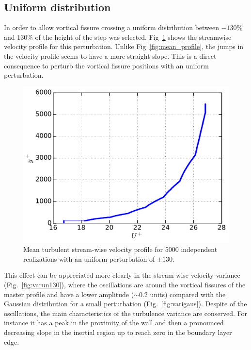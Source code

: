 \documentclass[aps,reprint,amsmath,amssymb,pra]{revtex4-1}%
\begin{document}
\subsection{Uniform distribution}
In order to allow vortical fissure crossing a uniform distribution between $-130\%$ and $130\%$ of the height of the step was selected. Fig~\ref{fig:mp_un130}  shows the streamwise velocity profile for this perturbation. Unlike Fig~\ref{fig:mean_profile}, the jumps in the velocity profile seems to have a more straight slope. This is a direct consequence to perturb the vortical fissure positions with an uniform perturbation.   
\begin{figure}[htb]
\includegraphics[scale=0.46]{figures/Master_averaged_step_profile_5000_assembles_un130}
\caption{\label{fig:mp_un130} Mean turbulent stream-wise velocity profile for 5000 independent realizations with an uniform perturbation of $\pm 130$.}
\end{figure}
This effect can be appreciated more clearly in the stream-wise velocity variance (Fig.~\ref{fig:varun130}), where the oscillations are around the vortical fissures of the master profile and have a lower amplitude ($\sim 0.2$ units) compared with the Gaussian distribution for a small perturbation (Fig.~\ref{fig:varigaus}). Despite of the oscillations, the main characteristics of the turbulence variance are conserved. For instance it has a peak in the proximity of the wall and then a pronounced decreasing slope in the inertial region up to reach zero in the boundary layer edge.
\end{document}
